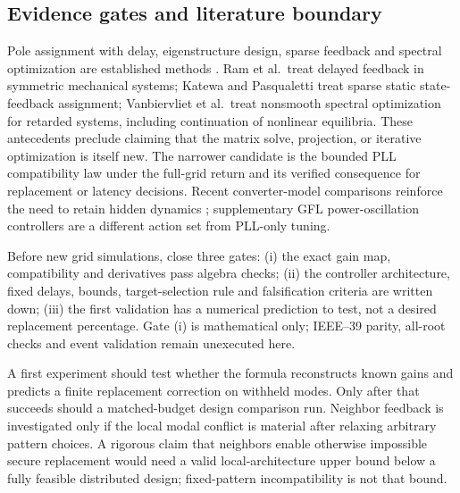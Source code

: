 \documentclass[11pt]{article}
\begin{document}
\subsection{Evidence gates and literature boundary}
Pole assignment with delay, eigenstructure design, sparse feedback and
spectral optimization are established methods
\cite{ram,katewa,vanbiervliet,mao}.
Ram et al.\ treat delayed feedback in symmetric mechanical systems;
Katewa and Pasqualetti treat sparse static state-feedback assignment;
Vanbiervliet et al.\ treat nonsmooth spectral optimization for retarded
systems, including continuation of nonlinear equilibria.
These antecedents preclude claiming that the matrix solve, projection,
or iterative optimization is itself new. The narrower candidate is
the bounded PLL compatibility law under the full-grid return and its
verified consequence for replacement or latency decisions.
Recent converter-model comparisons reinforce the need to retain
hidden dynamics \cite{coffey}; supplementary GFL power-oscillation
controllers \cite{chakraborty} are a different action set from PLL-only tuning.

Before new grid simulations, close three gates:
(i) the exact gain map, compatibility and derivatives pass algebra checks;
(ii) the controller architecture, fixed delays, bounds, target-selection
rule and falsification criteria are written down;
(iii) the first validation has a numerical prediction to test, not a
desired replacement percentage. Gate (i) is mathematical only; IEEE--39
parity, all-root checks and event validation remain unexecuted here.

A first experiment should test whether the formula reconstructs known
gains and predicts a finite replacement correction on withheld modes.
Only after that succeeds should a matched-budget design comparison run.
Neighbor feedback is investigated only if the local modal conflict is
material after relaxing arbitrary pattern choices. A rigorous claim
that neighbors enable otherwise impossible secure replacement would
need a valid local-architecture upper bound below a fully feasible
distributed design; fixed-pattern incompatibility is not that bound.
\end{document}
